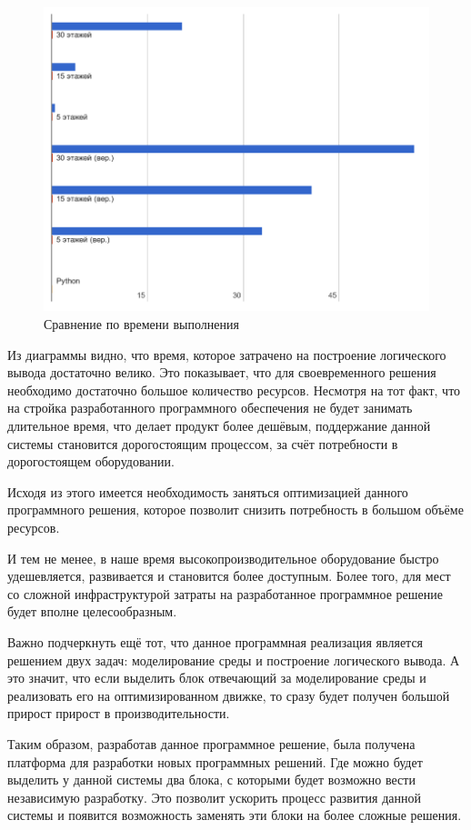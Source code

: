 	\begin{figure}[h]
		\centering
		\includegraphics[width=180mm]{src/pictures/projectp2.png}
		\caption{Сравнение по времени выполнения}\label{pt2}
	\end{figure}

	Из диаграммы видно, что время, которое затрачено на построение логического вывода достаточно велико.
		Это показывает, что для своевременного решения необходимо достаточно большое количество ресурсов.
		Несмотря на тот факт, что на стройка разработанного программного обеспечения не будет занимать
		длительное время, что делает продукт более дешёвым, поддержание данной системы становится
		дорогостоящим процессом, за счёт потребности в дорогостоящем оборудовании.

	Исходя из этого имеется необходимость заняться оптимизацией данного программного решения,
		которое позволит снизить потребность в большом объёме ресурсов.

	И тем не менее, в наше время высокопроизводительное оборудование быстро удешевляется, развивается и
		становится более доступным. Более того, для мест со сложной инфраструктурой затраты на
		разработанное программное решение будет вполне целесообразным.

	Важно подчеркнуть ещё тот, что данное программная реализация является решением двух задач: моделирование 
		среды и построение логического вывода. А это значит, что если выделить блок отвечающий
		за моделирование среды и реализовать его на оптимизированном движке, то сразу будет
		получен большой прирост прирост в производительности.

	Таким образом, разработав данное программное решение, была получена платформа для разработки
		новых программных решений. Где можно будет выделить у данной системы два блока, с которыми
		будет возможно вести независимую разработку. Это позволит ускорить процесс развития данной системы
		и появится возможность заменять эти блоки на более сложные решения.
